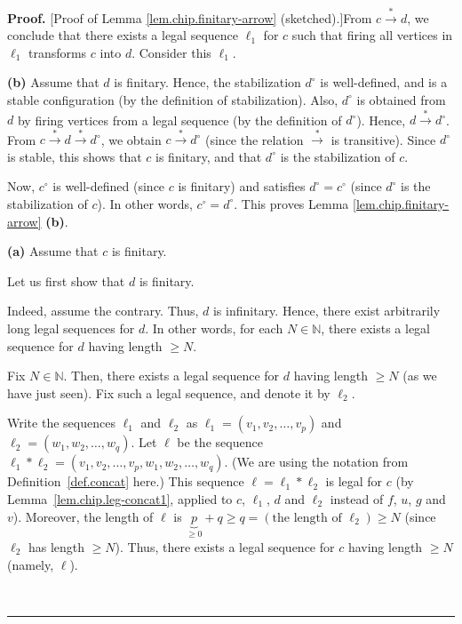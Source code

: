 \documentclass[numbers=enddot,12pt,final,onecolumn,notitlepage]{scrartcl}%
\theoremstyle{definition}
\newenvironment{proof}[1][Proof]{\noindent\textbf{#1.} }{\ \rule{0.5em}{0.5em}}
\begin{document}
\begin{proof}
[Proof of Lemma \ref{lem.chip.finitary-arrow} (sketched).]From $c\overset{\ast
}{\rightarrow}d$, we conclude that there exists a legal sequence $\ell_{1}$
for $c$ such that firing all vertices in $\ell_{1}$ transforms $c$ into $d$.
Consider this $\ell_{1}$.

\textbf{(b)} Assume that $d$ is finitary. Hence, the stabilization $d^{\circ}$
is well-defined, and is a stable configuration (by the definition of
stabilization). Also, $d^{\circ}$ is obtained from $d$ by firing vertices from
a legal sequence (by the definition of $d^{\circ}$). Hence, $d\overset{\ast
}{\rightarrow}d^{\circ}$. From $c\overset{\ast}{\rightarrow}d\overset{\ast
}{\rightarrow}d^{\circ}$, we obtain $c\overset{\ast}{\rightarrow}d^{\circ}$
(since the relation $\overset{\ast}{\rightarrow}$ is transitive). Since
$d^{\circ}$ is stable, this shows that $c$ is finitary, and that $d^{\circ}$
is the stabilization of $c$.

Now, $c^{\circ}$ is well-defined (since $c$ is finitary) and satisfies
$d^{\circ}=c^{\circ}$ (since $d^{\circ}$ is the stabilization of $c$). In
other words, $c^{\circ}=d^{\circ}$. This proves Lemma
\ref{lem.chip.finitary-arrow} \textbf{(b)}.

\textbf{(a)} Assume that $c$ is finitary.

Let us first show that $d$ is finitary.

Indeed, assume the contrary. Thus, $d$ is infinitary. Hence, there exist
arbitrarily long legal sequences for $d$. In other words, for each
$N\in\mathbb{N}$, there exists a legal sequence for $d$ having length $\geq N$.

Fix $N\in\mathbb{N}$. Then, there exists a legal sequence for $d$ having
length $\geq N$ (as we have just seen). Fix such a legal sequence, and denote
it by $\ell_{2}$.

Write the sequences $\ell_{1}$ and $\ell_{2}$ as $\ell_{1}=\left(  v_{1}%
,v_{2},\ldots,v_{p}\right)  $ and $\ell_{2}=\left(  w_{1},w_{2},\ldots
,w_{q}\right)  $. Let $\ell$ be the sequence $\ell_1 \ast \ell_2
= \left(  v_{1},v_{2},\ldots ,v_{p},w_{1},w_{2},\ldots,w_{q}\right)  $.
(We are using the notation from Definition~\ref{def.concat} here.)
This sequence
$\ell = \ell_1 \ast \ell_2$ is legal for $c$
(by Lemma~\ref{lem.chip.leg-concat1}, applied to
$c$, $\ell_1$, $d$ and $\ell_2$
instead of $f$, $u$, $g$ and $v$).
Moreover, the length of $\ell$ is $\underbrace{p}_{\geq0}+q\geq
q=\left(  \text{the length of }\ell_{2}\right)  \geq N$ (since $\ell_{2}$ has
length $\geq N$). Thus, there exists a legal sequence for $c$ having length
$\geq N$ (namely, $\ell$).


\end{proof}
\end{document}
